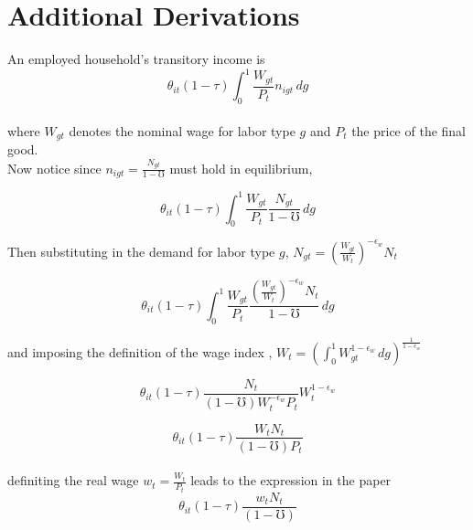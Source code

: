 \documentclass[titlepage]{\econtex}\providecommand{\texname}{BufferStockTheory}
\begin{document}
  
\hypertarget{Additional Derivations}{}
\section{Additional Derivations} 

An employed household's transitory income is \\

$$ \theta_{it}(1-\tau) \int_{0}^{1} \frac{W_{gt}}{P_{t}}n_{igt}\,dg$$\\

where $W_{gt}$ denotes the nominal wage for labor type $g$ and $P_{t}$ the price of the final good. \\ 

Now notice since $n_{igt} = \frac{N_{gt}}{1-\mho}$ must hold in equilibrium,

$$ \theta_{it}(1-\tau) \int_{0}^{1} \frac{W_{gt}}{P_{t}}\frac{N_{gt}}{1-\mho}\,dg$$

Then substituting in the demand for labor type $g$, $ N_{gt} = \left(\frac{W_{gt}}{W_{t}}\right)^{-\epsilon_{w}} N_{t} $

$$ \theta_{it}(1-\tau) \int_{0}^{1} \frac{W_{gt}}{P_{t}}\frac{\left(\frac{W_{gt}}{W_{t}}\right)^{-\epsilon_{w}} N_{t}}{1-\mho}\,dg$$

and imposing the definition of the wage index , $W_{t} = \left(\int_{0}^{1} W_{gt}^{1-\epsilon_{w}}\,dg\right)^{\frac{1}{1-\epsilon_{w}}}$

$$\theta_{it}(1-\tau) \frac{N_{t}}{(1-\mho) W_{t}^{-\epsilon_{w}}P_{t}} W_{t}^{1-\epsilon_{w}} $$

$$ \theta_{it}(1-\tau) \frac{W_{t}N_{t}}{(1-\mho)P_{t} }$$\\

definiting the real wage $w_{t} = \frac{W_{t}}{P_{t}}$ leads to the expression in the paper \\

$$ \theta_{it}(1-\tau) \frac{w_{t}N_{t}}{(1-\mho)}$$




%


\end{document}

